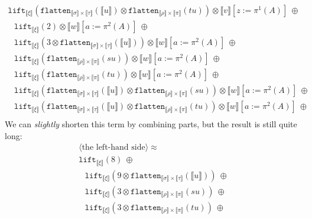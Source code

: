 \documentclass[a4paper,UKenglish,cleveref,autoref,numberwithinsect]{lipics-v2019}
\theoremstyle{definition}
\newcommand{\flatten}{\mathtt{flatten}}
\newcommand{\lift}{\mathtt{lift}}
\newcommand{\typeinterpret}[1]{\llbracket #1 \rrbracket}
\newcommand{\interpret}[1]{\llbracket #1 \rrbracket}
\begin{document}
\begin{itemize}
\[\begin{array}{l}
    \lift_{\typeinterpret{\xi}}(\flatten_{\typeinterpret{\sigma} \times
    \typeinterpret{\tau}}(\interpret{u}) \otimes
    \flatten_{\typeinterpret{\rho} \times \typeinterpret{\pi}}(tu))
    \otimes
     \interpret{v}[z:=\pi^1(A)]
    \ \oplus \\
  \phantom{A}
    \lift_{\typeinterpret{\xi}}(2) \otimes
    \interpret{w}[a:=\pi^2(A)]
    \ \oplus \\
  \phantom{A}
    \lift_{\typeinterpret{\xi}}(3 \otimes
    \flatten_{\typeinterpret{\sigma} \times \typeinterpret{\tau}}(
    \interpret{u})) \otimes
    \interpret{w}[a:=\pi^2(A)]
    \ \oplus \\
  \phantom{A}
    \lift_{\typeinterpret{\xi}}(\flatten_{\typeinterpret{\rho} \times
    \typeinterpret{\pi}}(su)) \otimes
    \interpret{w}[a:=\pi^2(A)]
    \ \oplus\\
  \phantom{A}
    \lift_{\typeinterpret{\xi}}(\flatten_{\typeinterpret{\rho} \times
    \typeinterpret{\pi}}(tu)) \otimes
    \interpret{w}[a:=\pi^2(A)]
    \ \oplus \\
  \phantom{A}
    \lift_{\typeinterpret{\xi}}(\flatten_{\typeinterpret{\sigma} \times
    \typeinterpret{\tau}}(\interpret{u}) \otimes
    \flatten_{\typeinterpret{\rho} \times \typeinterpret{\pi}}(su))
    \otimes
    \interpret{w}[a:=\pi^2(A)]
    \ \oplus \\
  \phantom{A}
    \lift_{\typeinterpret{\xi}}(\flatten_{\typeinterpret{\sigma} \times
    \typeinterpret{\tau}}(\interpret{u}) \otimes
    \flatten_{\typeinterpret{\rho} \times \typeinterpret{\pi}}(tu))
    \otimes
    \interpret{w}[a:=\pi^2(A)]
    \ \oplus \\
  \end{array}
  \]
  We can \emph{slightly} shorten this term by combining parts, but
  the result is still quite long:
  \[
  \begin{array}{l}
  \langle\text{the left-hand side}\rangle \approx \\
  \lift_{\typeinterpret{\xi}}(8)\ \oplus \\
  \phantom{A}
     \lift_{\typeinterpret{\xi}}(9 \otimes
      \flatten_{\typeinterpret{\sigma} \times \typeinterpret{\tau}}(
      \interpret{u}))\ \oplus \\
  \phantom{A}
    \lift_{\typeinterpret{\xi}}(3 \otimes \flatten_{\typeinterpret{\rho}
    \times \typeinterpret{\pi}}(su))\ \oplus \\
  \phantom{A}
    \lift_{\typeinterpret{\xi}}(3 \otimes \flatten_{\typeinterpret{\rho}
    \times \typeinterpret{\pi}}(tu))\ \oplus \\

\end{array}\]
\end{itemize}
\end{document}
